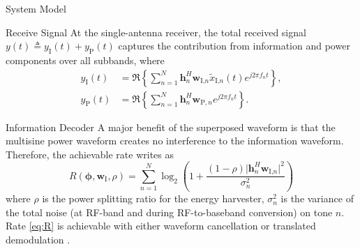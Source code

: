 \documentclass[journal]{IEEEtran}
\begin{document}
\begin{section}{System Model}
		\begin{subsection}{Receive Signal}
			At the single-antenna receiver, the total received signal $y(t) \triangleq y_{\text{I}}(t)+y_\text{P}(t)$ captures the contribution from information and power components over all subbands, where
			\begin{align}
				y_{\text{I}}(t) & = \Re\left\{\sum_{n=1}^N{\boldsymbol{h}_{n}^H}{\boldsymbol{w}_{\text{I,}n}\tilde{x}_{\text{I,}n}(t)}{e^{j2{\pi}{f_n}{t}}}\right\},\label{eq:y_I}\\
				y_{\text{P}}(t) & = \Re\left\{\sum_{n=1}^N{\boldsymbol{h}_{n}^H}\boldsymbol{w}_{\text{P},n}{e^{j2{\pi}{f_n}{t}}}\right\}.\label{eq:y_P}
			\end{align}
		\end{subsection}


		\begin{subsection}{Information Decoder}
			A major benefit of the superposed waveform is that the multisine power waveform creates no interference to the information waveform. Therefore, the achievable rate writes as
			\begin{equation}\label{eq:R}
				R(\boldsymbol{\phi},\boldsymbol{w}_{\text{I}},\rho) = \sum_{n=1}^N{\log_2\left(1+\frac{(1-\rho)\lvert \boldsymbol{h}_{n}^H\boldsymbol{w}_{\text{I,}n} \rvert^2}{\sigma_n^2}\right)}
			\end{equation}
			where $\rho$ is the power splitting ratio for the energy harvester, $\sigma_n^2$ is the variance of the total noise (at RF-band and during RF-to-baseband conversion) on tone $n$. Rate \eqref{eq:R} is achievable with either waveform cancellation or translated demodulation \cite{Clerckx2018b}.
		\end{subsection}



\end{section}
\end{document}
